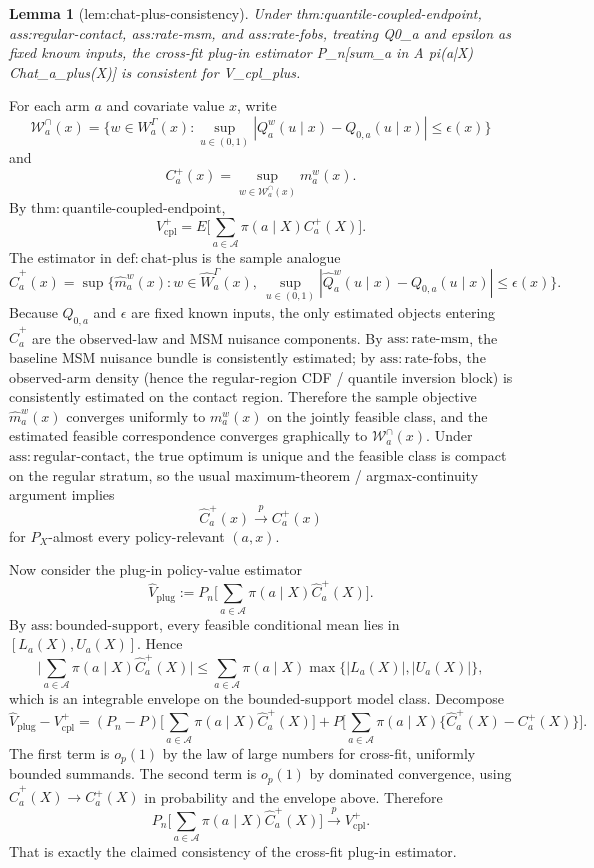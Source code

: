 \documentclass{article}
\newtheorem{lemma}{Lemma}
\begin{document}
\begin{lemma}[lem:chat-plus-consistency]\label{lem:chat-plus-consistency}
Under thm:quantile-coupled-endpoint, ass:regular-contact, ass:rate-msm, and ass:rate-fobs, treating Q0_a and epsilon as fixed known inputs, the cross-fit plug-in estimator P_n[sum_{a in A} pi(a|X) Chat_a_plus(X)] is consistent for V_cpl_plus.
\end{lemma}
For each arm \(a\) and covariate value \(x\), write
\[
\mathcal W_a^{\cap}(x)=\Big\{w\in W_a^{\Gamma}(x):\sup_{u\in(0,1)}|Q_a^w(u\mid x)-Q_{0,a}(u\mid x)|\le\epsilon(x)\Big\}
\]
and
\[
C_a^+(x)=\sup_{w\in\mathcal W_a^{\cap}(x)}m_a^w(x).
\]
By \(\mathrm{thm\!:\!quantile\mbox{-}coupled\mbox{-}endpoint}\),
\[
V_{\mathrm{cpl}}^+=E\Big[\sum_{a\in\mathcal A}\pi(a\mid X)C_a^+(X)\Big].
\]
The estimator in \(\mathrm{def\!:\!chat\mbox{-}plus}\) is the sample analogue
\[
\widehat C_a^+(x)=\sup\Big\{\widehat m_a^w(x):w\in \widehat W_a^{\Gamma}(x),\ \sup_{u\in(0,1)}|\widehat Q_a^w(u\mid x)-Q_{0,a}(u\mid x)|\le\epsilon(x)\Big\}.
\]
Because \(Q_{0,a}\) and \(\epsilon\) are fixed known inputs, the only estimated objects entering \(\widehat C_a^+\) are the observed-law and MSM nuisance components. By \(\mathrm{ass\!:\!rate\mbox{-}msm}\), the baseline MSM nuisance bundle is consistently estimated; by \(\mathrm{ass\!:\!rate\mbox{-}fobs}\), the observed-arm density (hence the regular-region CDF / quantile inversion block) is consistently estimated on the contact region. Therefore the sample objective \(\widehat m_a^w(x)\) converges uniformly to \(m_a^w(x)\) on the jointly feasible class, and the estimated feasible correspondence converges graphically to \(\mathcal W_a^{\cap}(x)\). Under \(\mathrm{ass\!:\!regular\mbox{-}contact}\), the true optimum is unique and the feasible class is compact on the regular stratum, so the usual maximum-theorem / argmax-continuity argument implies
\[
\widehat C_a^+(x)\xrightarrow{p}C_a^+(x)
\]
for \(P_X\)-almost every policy-relevant \((a,x)\).

Now consider the plug-in policy-value estimator
\[
\widehat V_{\mathrm{plug}}:=P_n\Big[\sum_{a\in\mathcal A}\pi(a\mid X)\widehat C_a^+(X)\Big].
\]
By \(\mathrm{ass\!:\!bounded\mbox{-}support}\), every feasible conditional mean lies in \([L_a(X),U_a(X)]\). Hence
\[
\Big|\sum_{a\in\mathcal A}\pi(a\mid X)\widehat C_a^+(X)\Big|
\le \sum_{a\in\mathcal A}\pi(a\mid X)\max\{|L_a(X)|,|U_a(X)|\},
\]
which is an integrable envelope on the bounded-support model class. Decompose
\[
\widehat V_{\mathrm{plug}}-V_{\mathrm{cpl}}^+
=(P_n-P)\Big[\sum_{a\in\mathcal A}\pi(a\mid X)\widehat C_a^+(X)\Big]
+P\Big[\sum_{a\in\mathcal A}\pi(a\mid X)\{\widehat C_a^+(X)-C_a^+(X)\}\Big].
\]
The first term is \(o_p(1)\) by the law of large numbers for cross-fit, uniformly bounded summands. The second term is \(o_p(1)\) by dominated convergence, using \(\widehat C_a^+(X)\to C_a^+(X)\) in probability and the envelope above. Therefore
\[
P_n\Big[\sum_{a\in\mathcal A}\pi(a\mid X)\widehat C_a^+(X)\Big]\xrightarrow{p}V_{\mathrm{cpl}}^+.
\]
That is exactly the claimed consistency of the cross-fit plug-in estimator.
\end{document}
